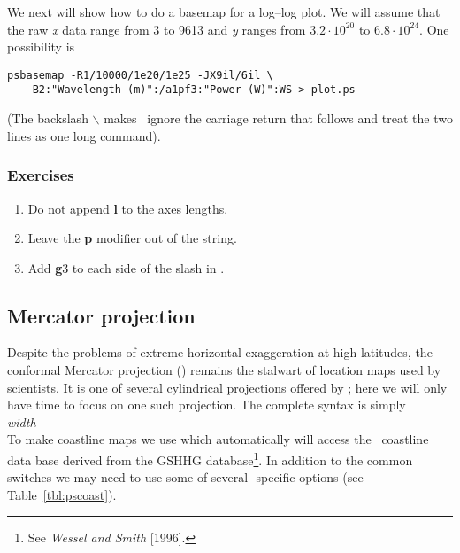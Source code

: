 \documentclass{report}
\begin{document}
We next will show how to do a basemap for a log--log plot.  We will
assume that the raw \emph{x} data range from 3 to 9613 and \emph{y}
ranges from $3.2 \cdot 10^{20}$ to $6.8 \cdot 10^{24}$.  One possibility is

{\small\begin{verbatim} 
psbasemap -R1/10000/1e20/1e25 -JX9il/6il \
   -B2:"Wavelength (m)":/a1pf3:"Power (W)":WS > plot.ps 
\end{verbatim}
}

\noindent
(The backslash $\backslash$ makes \UNIX\ ignore the carriage return that follows and treat the two lines as one long command).

\subsubsection{Exercises}

\begin{enumerate}

\item Do not append \textbf{l} to the axes lengths.

\item Leave the \textbf{p} modifier out of the  string.

\item Add \textbf{g}3 to each side of the slash in .

\end{enumerate}

\subsection{Mercator projection}

Despite the problems of extreme horizontal exaggeration at high
latitudes, the conformal Mercator projection () remains
the stalwart of location maps used by scientists.  It is one
of several cylindrical projections offered by \GMT; here we
will only have time to focus on one such projection.  The
complete syntax is simply \\

\emph{width} \\

To make coastline maps we use  which automatically will
access the \GMT\ coastline data base derived from the GSHHG
database\footnote{See \emph{Wessel and Smith} [1996].}.  In addition
to the common switches we may need to use some of several 
-specific options (see Table~\ref{tbl:pscoast}).
\end{document}
